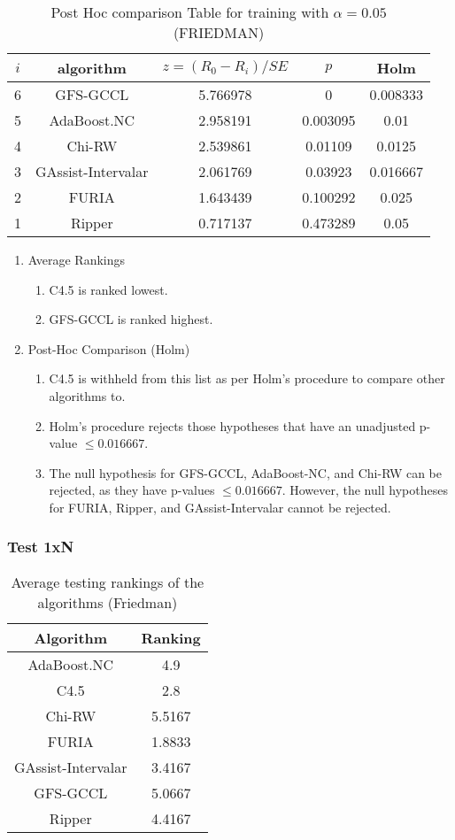 \documentclass[a4paper,11pt]{article}
\begin{document}
\begin{table}[!htp]
\centering\footnotesize
\begin{tabular}{ccccc}
$i$&algorithm&$z=(R_0 - R_i)/SE$&$p$&Holm \\
\hline6& GFS-GCCL &5.766978&0&0.008333\\5& AdaBoost.NC &2.958191&0.003095&0.01\\4& Chi-RW &2.539861&0.01109&0.0125\\3& GAssist-Intervalar &2.061769&0.03923&0.016667\\2& FURIA &1.643439&0.100292&0.025\\1& Ripper&0.717137&0.473289&0.05\\\hline
\end{tabular}
\caption{Post Hoc comparison Table for training with $\alpha=0.05$ (FRIEDMAN)}
\end{table}

\begin{enumerate}
\item  Average Rankings
\begin{enumerate}
\item C4.5 is ranked lowest.
\item GFS-GCCL is ranked highest.
\end{enumerate}
\item Post-Hoc Comparison (Holm)
\begin{enumerate}
\item C4.5 is withheld from this list as per Holm’s procedure to compare other algorithms to.
\item Holm's procedure rejects those hypotheses that have an unadjusted p-value $\le0.016667$.
\item The null hypothesis for GFS-GCCL, AdaBoost-NC, and Chi-RW can be rejected, as they have p-values $\le0.016667$. However, the null hypotheses for FURIA, Ripper, and GAssist-Intervalar cannot be rejected.
\end{enumerate}
\end{enumerate}

\subsubsection{Test 1xN}

\begin{table}[!htp]
\centering
\begin{tabular}{|c|c|}\hline
Algorithm&Ranking\\\hline
 AdaBoost.NC &4.9\\ C4.5 &2.8\\ Chi-RW &5.5167\\ FURIA &1.8833\\ GAssist-Intervalar &3.4167\\ GFS-GCCL &5.0667\\ Ripper&4.4167\\\hline\end{tabular}
\caption{Average testing rankings of the algorithms (Friedman)}
\end{table}
\end{document}
